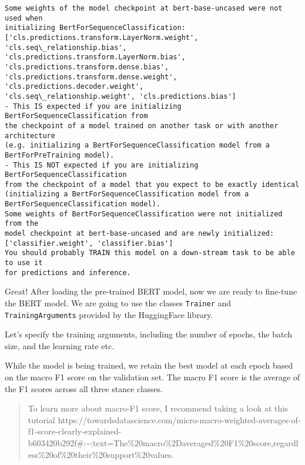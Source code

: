 \documentclass[11pt]{article}
\begin{document}
    \begin{Verbatim}[commandchars=\\\{\}]
Some weights of the model checkpoint at bert-base-uncased were not used when
initializing BertForSequenceClassification:
['cls.predictions.transform.LayerNorm.weight', 'cls.seq\_relationship.bias',
'cls.predictions.transform.LayerNorm.bias',
'cls.predictions.transform.dense.bias',
'cls.predictions.transform.dense.weight', 'cls.predictions.decoder.weight',
'cls.seq\_relationship.weight', 'cls.predictions.bias']
- This IS expected if you are initializing BertForSequenceClassification from
the checkpoint of a model trained on another task or with another architecture
(e.g. initializing a BertForSequenceClassification model from a
BertForPreTraining model).
- This IS NOT expected if you are initializing BertForSequenceClassification
from the checkpoint of a model that you expect to be exactly identical
(initializing a BertForSequenceClassification model from a
BertForSequenceClassification model).
Some weights of BertForSequenceClassification were not initialized from the
model checkpoint at bert-base-uncased and are newly initialized:
['classifier.weight', 'classifier.bias']
You should probably TRAIN this model on a down-stream task to be able to use it
for predictions and inference.
    \end{Verbatim}

    Great! After loading the pre-trained BERT model, now we are ready to
fine-tune the BERT model. We are going to use the classes
\texttt{Trainer} and \texttt{TrainingArguments} provided by the
HuggingFace library.

    Let's specify the training arguments, including the number of epochs,
the batch size, and the learning rate etc.

While the model is being trained, we retain the best model at each epoch
based on the macro F1 score on the validation set. The macro F1 score is
the average of the F1 scores across all three stance classes.

    \begin{quote}
To learn more about macro-F1 score, I recommend taking a look at this
tutorial
https://towardsdatascience.com/micro-macro-weighted-averages-of-f1-score-clearly-explained-b603420b292f\#:\textasciitilde:text=The\%20macro\%2Daveraged\%20F1\%20score,regardless\%20of\%20their\%20support\%20values.
\end{quote}
\end{document}
